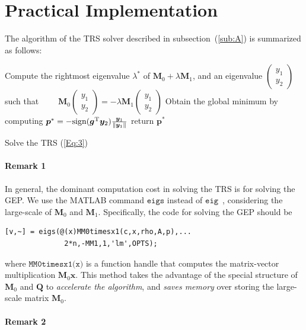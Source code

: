 \section{Practical Implementation}

The algorithm of the TRS solver described in subsection~(\ref{sub:A}) is summarized as follows:

\begin{algorithm}

    Compute the rightmost eigenvalue $\lambda^*$ of $\bm M_0+\lambda\bm M_1$,  and an eigenvalue $\begin{pmatrix}
y_1\\y_2
\end{pmatrix}$ such that 
$
\qquad\bm M_0\begin{pmatrix}
y_1\\y_2
\end{pmatrix}=-\lambda\bm M_1\begin{pmatrix}
y_1\\y_2
\end{pmatrix}
$\;
    {
    Obtain the global minimum by computing $\bm p^*=-\mbox{sign}(\bm g^{\mathrm T}\bm y_2)\frac{\bm y_1}{\|\bm y_1\|}$\;
    }
      {
        return $\bm p^*$\;
      }
    \caption{Solve the TRS (\ref{Eq:3})}
\end{algorithm}
\paragraph{Remark 1}

In general, the dominant computation cost in solving the TRS is for solving the GEP. We use the MATLAB command $\texttt{eigs}$ instead of $\texttt{eig}$~, considering the large-scale of $\bm M_0$ and $\bm M_1$. Specifically, the code for solving the GEP should be
\begin{verbatim}
[v,~] = eigs(@(x)MM0timesx1(c,x,rho,A,p),...
              2*n,-MM1,1,'lm',OPTS);
\end{verbatim}
where $\texttt{MM0timesx1(x)}$ is a function handle that computes the matrix-vector multiplication $\bm M_0\bm x$. This method takes the advantage of the special structure of $\bm M_0$ and $\bm Q$ to \emph{accelerate the algorithm}, and \emph{saves memory} over storing the large-scale matrix $\bm M_0$.
\paragraph{Remark 2}

